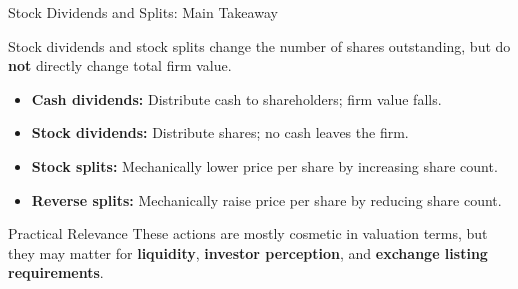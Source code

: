 \begin{frame}{Stock Dividends and Splits: Main Takeaway}
\begin{block}{}
\centering
Stock dividends and stock splits change the number of shares outstanding, but do \textbf{not} directly change total firm value.
\end{block}

\vspace{3mm}
\begin{itemize}
    \item \textbf{Cash dividends:} Distribute cash to shareholders; firm value falls.
    \item \textbf{Stock dividends:} Distribute shares; no cash leaves the firm.
    \item \textbf{Stock splits:} Mechanically lower price per share by increasing share count.
    \item \textbf{Reverse splits:} Mechanically raise price per share by reducing share count.
\end{itemize}

\vspace{3mm}
\begin{alertblock}{Practical Relevance}
These actions are mostly cosmetic in valuation terms, but they may matter for \textbf{liquidity}, \textbf{investor perception}, and \textbf{exchange listing requirements}.
\end{alertblock}
\end{frame}

